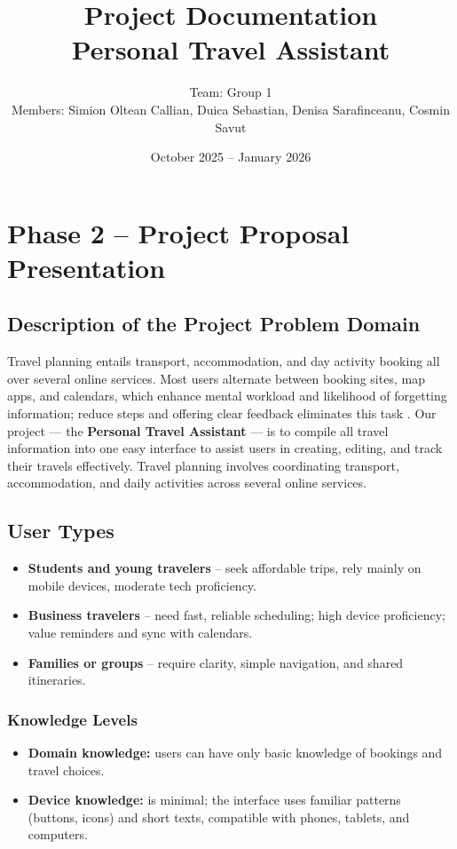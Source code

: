 \documentclass[11pt,a4paper]{article}
\title{\vspace{-1em}\textbf{Project Documentation}\\
\large Personal Travel Assistant}
\author{Team: Group 1\\
Members: Simion Oltean Callian, Duica Sebastian, Denisa Sarafinceanu, Cosmin Savut}
\date{October 2025 – January 2026}
\begin{document}
\maketitle
\vspace{-1em}

\tableofcontents
\newpage

\section*{Phase 2 – Project Proposal Presentation}

\subsection{Description of the Project Problem Domain}

Travel planning entails transport, accommodation, and day activity booking all over
several online services. Most users alternate between booking sites, map apps, and calendars,
which enhance mental workload and likelihood of forgetting information; reduce steps and offering
clear feedback eliminates this task \cite{card1983psychology}. Our project — the \textbf{Personal Travel Assistant} — is
to compile all travel information into one easy interface to assist users in creating, editing, and
track their travels effectively.
Travel planning involves coordinating transport, accommodation, and daily activities across several online services.

\subsection{User Types}
\begin{itemize}
  \item \textbf{Students and young travelers} – seek affordable trips, rely mainly on mobile devices, moderate tech proficiency.
  \item \textbf{Business travelers} – need fast, reliable scheduling; high device proficiency; value reminders and sync with calendars.
  \item \textbf{Families or groups} – require clarity, simple navigation, and shared itineraries.
\end{itemize}

\subsubsection*{Knowledge Levels}
\begin{itemize}
  \item \textbf{Domain knowledge:} users can have only basic knowledge of bookings and travel choices.
  \item \textbf{Device knowledge:} is minimal; the interface uses familiar patterns (buttons, icons) and short texts, compatible with phones, tablets, and computers.
\end{itemize}
\end{document}
